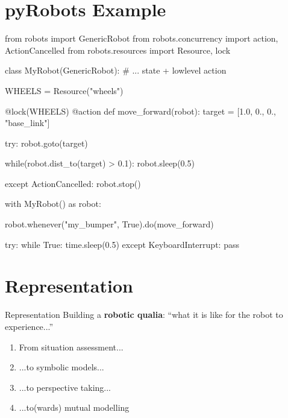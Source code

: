 \documentclass[xcolor=table]{beamer}
\begin{document}

\section[pyRobots]{pyRobots Example}


\begin{frame}[fragile]
\begin{pythoncode}
    from robots import GenericRobot
    from robots.concurrency import action, ActionCancelled
    from robots.resources import Resource, lock

    class MyRobot(GenericRobot):
        # ... state + lowlevel action

    WHEELS = Resource("wheels")

    @lock(WHEELS)
    @action
    def move_forward(robot):
        target = [1.0, 0., 0., "base_link"]

        try:
            robot.goto(target)

            while(robot.dist_to(target) > 0.1):
                robot.sleep(0.5)

        except ActionCancelled:
            robot.stop()

\end{pythoncode}
\end{frame}


\begin{frame}[fragile]
\begin{pythoncode}
    with MyRobot() as robot:

        robot.whenever("my_bumper", True).do(move_forward)

        try:
            while True:
                time.sleep(0.5)
        except KeyboardInterrupt:
            pass
\end{pythoncode}
\end{frame}

\section{Representation}

\begin{frame}{Representation}
    Building a \textbf{robotic qualia}: ``what it is like for the robot to experience...''
    \pause

    \begin{enumerate}
        \item From situation assessment...
        \item ...to symbolic models...
        \item ...to perspective taking...
        \item ...to(wards) mutual modelling
   \end{enumerate}

\end{frame}
\end{document}
